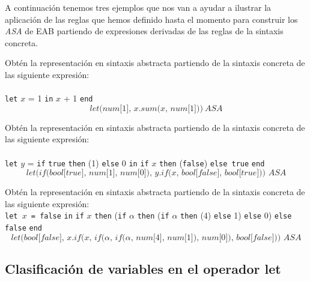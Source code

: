     A continuación tenemos tres ejemplos que nos van a ayudar a ilustrar la aplicación de las reglas que hemos definido hasta el momento para construir los \textit{ASA} de \textsf{EAB} partiendo de expresiones derivadas de las reglas de la sintaxis concreta.

    \begin{exercise}
        Obtén la representación en sintaxis abstracta partiendo de la sintaxis concreta de las siguiente expresión: \\\\
        \texttt{let} $x$ = 1 \texttt{in} $x$ + 1 \texttt{end}\\
        \[
            \textit{let(num[1], $x$.sum($x$, num[1]))}\ ASA
        \]
    \end{exercise}

    \begin{exercise}
        Obtén la representación en sintaxis abstracta partiendo de la sintaxis concreta de las siguiente expresión: \\\\
        \texttt{let} $y$ = \texttt{if} \texttt{true} \texttt{then} (1) \texttt{else} 0 \texttt{in} \texttt{if} $x$ \texttt{then} (\texttt{false}) \texttt{else true} \texttt{end}\\
        \[
            \textit{let(if(bool[true], num[1], num[0]), $y$.if($x$, bool[false], bool[true]))\ ASA}
        \]
    \end{exercise}

    \begin{exercise}
        Obtén la representación en sintaxis abstracta partiendo de la sintaxis concreta de las siguiente expresión: \\
        
        \texttt{let $x$ = false} \texttt{in} \texttt{if} $x$ \texttt{then} (\texttt{if} $\alpha$ \texttt{then} (\texttt{if} $\alpha$ \texttt{then} (4) \texttt{else} 1) \texttt{else} 0) \texttt{else false} \texttt{end}\\
        \[
            \textit{let(bool[false], x.if(x, if($\alpha$, if($\alpha$, num[4], num[1]), num[0]), bool[false])) ASA}
        \]        
    \end{exercise}

  

    \subsection{Clasificación de variables en el operador let}
    
